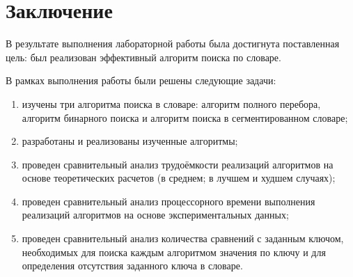 \chapter*{Заключение}

В результате выполнения лабораторной работы была достигнута поставленная цель: был реализован эффективный алгоритм поиска по словаре.


В рамках выполнения работы были решены следующие задачи: 
\begin{enumerate}[label={\arabic*)}]
	\item изучены три алгоритма поиска в словаре: алгоритм полного перебора, алгоритм бинарного поиска и алгоритм поиска в сегментированном словаре;
	\item разработаны и реализованы изученные алгоритмы;
	\item проведен сравнительный анализ трудоёмкости реализаций алгоритмов на основе теоретических расчетов (в среднем; в лучшем и худшем случаях);
	\item проведен сравнительный анализ процессорного времени выполнения реализаций алгоритмов на основе экспериментальных данных;
	\item проведен сравнительный анализ количества сравнений с заданным ключом, необходимых для поиска каждым алгоритмом значения по ключу и для определения отсутствия заданного ключа в словаре.
	
\end{enumerate}



